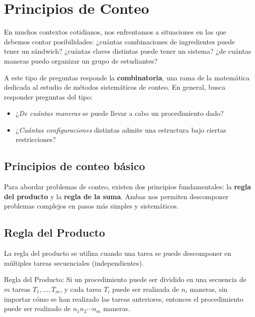 

\section{Principios de Conteo}
En muchos contextos cotidianos, nos enfrentamos a situaciones en las que debemos contar posibilidades: ¿cuántas combinaciones de ingredientes puede tener un sándwich? ¿cuántas claves distintas puede tener un sistema? ¿de cuántas maneras puedo organizar un grupo de estudiantes? 

A este tipo de preguntas responde la \textbf{combinatoria}, una rama de la matemática dedicada al estudio de métodos sistemáticos de conteo.
En general, busca responder preguntas del tipo:

\begin{itemize}
    \item ¿\textit{De cuántas maneras} se puede llevar a cabo un procedimiento dado?
    \item ¿\textit{Cuántas configuraciones} distintas admite una estructura bajo ciertas restricciones?
\end{itemize}


\subsection{Principios de conteo básico}

Para abordar problemas de conteo, existen dos principios fundamentales: la 	\textbf{regla del producto} y la \textbf{regla de la suma}. Ambas nos permiten descomponer problemas complejos en pasos más simples y sistemáticos.

\subsection*{Regla del Producto}
La regla del producto se utiliza cuando una tarea se puede descomponer en múltiples tareas secuenciales (independientes).

\begin{definitionblock}{Regla del Producto:}  
Si un procedimiento puede ser dividido en una secuencia de $m$ tareas $T_1,\dots,T_m$, y cada tarea $T_i$ puede ser realizada de $n_i$ maneras, sin importar cómo se han realizado las tareas anteriores, entonces el procedimiento puede ser realizado de $n_1 n_2 \cdots n_m$ maneras.
\end{definitionblock}

